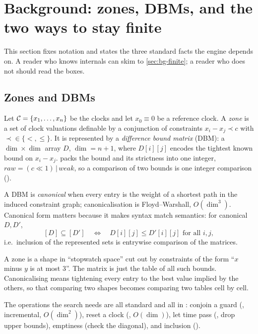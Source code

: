 \section{Background: zones, DBMs, and the two ways to stay finite}
\label{sec:background}

This section fixes notation and states the three standard facts the engine
depends on.  A reader who knows \uppaal{} internals can skim to
\cref{sec:bg-finite}; a reader who does not should read the boxes.

\subsection{Zones and DBMs}

Let $\mathcal{C} = \{x_1,\dots,x_n\}$ be the clocks and let $x_0 \equiv 0$ be a
reference clock.  A \emph{zone} is a set of clock valuations definable by a
conjunction of constraints $x_i - x_j \prec c$ with ${\prec} \in \{<,\le\}$.
It is represented by a \emph{difference bound matrix} (DBM): a
$\dim \times \dim$ array $D$, $\dim = n+1$, where $D[i][j]$ encodes the
tightest known bound on $x_i - x_j$.  \tool{} packs the bound and its
strictness into one integer, $\mathit{raw} = (c \ll 1)\,|\,\mathit{weak}$, so a
comparison of two bounds is one integer comparison
().

A DBM is \emph{canonical} when every entry is the weight of a shortest path in
the induced constraint graph; canonicalisation is Floyd--Warshall,
$O(\dim^3)$.  Canonical form matters because it makes syntax match semantics:
for canonical $D, D'$,
\[
  [D] \subseteq [D'] \quad\iff\quad D[i][j] \le D'[i][j] \text{ for all } i,j ,
\]
i.e.\ inclusion of the represented sets is entrywise comparison of the
matrices.

\begin{intuition}
A zone is a shape in ``stopwatch space'' cut out by constraints of the form
``$x$ minus $y$ is at most $3$''.  The matrix is just the table of all such
bounds.  Canonicalising means tightening every entry to the best value
implied by the others, so that comparing two shapes becomes comparing two
tables cell by cell.
\end{intuition}

The operations the search needs are all standard and all in
: conjoin a guard (, incremental, $O(\dim^2)$),
reset a clock (, $O(\dim)$), let time pass (,
drop upper bounds), emptiness (check the diagonal), and inclusion
().

